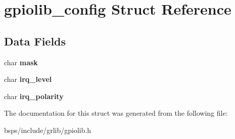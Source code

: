 \hypertarget{structgpiolib__config}{}\section{gpiolib\+\_\+config Struct Reference}
\label{structgpiolib__config}
\subsection*{Data Fields}
\begin{DoxyCompactItemize}
\item 
\mbox{\label{structgpiolib__config_a9ab1988abf979c1b42acc79a49e2e383}} 
char {\bfseries mask}
\item 
\mbox{\label{structgpiolib__config_af923d0daebc28cf3464c84284fbbe0db}} 
char {\bfseries irq\+\_\+level}
\item 
\mbox{\label{structgpiolib__config_aafc23e2a1363df09456aef8f952ce94f}} 
char {\bfseries irq\+\_\+polarity}
\end{DoxyCompactItemize}


The documentation for this struct was generated from the following file\+:\begin{DoxyCompactItemize}
\item 
bsps/include/grlib/gpiolib.\+h\end{DoxyCompactItemize}
